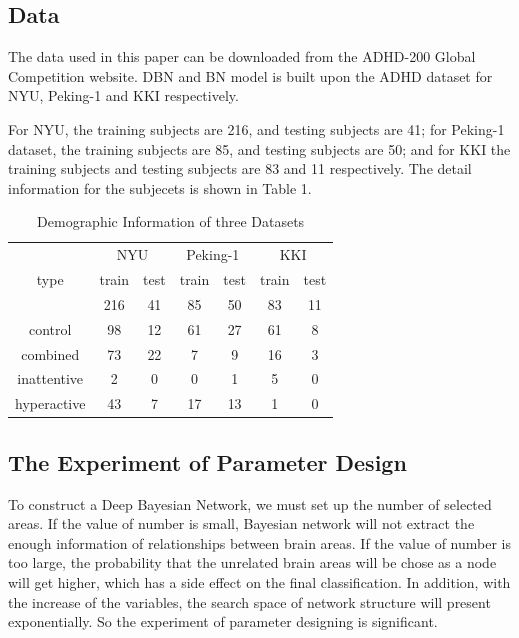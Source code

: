 \documentclass{article}
\begin{document}
\subsection{Data}
The data used in this paper can be downloaded from the ADHD-200 Global Competition website. DBN and BN model is built upon the ADHD dataset for NYU, Peking-1 and KKI respectively.


For NYU, the training subjects are 216, and testing subjects are 41; for Peking-1 dataset, the training subjects are 85, and testing subjects are 50; and for KKI the training subjects and testing subjects are 83 and 11 respectively. The detail information for the subjecets is shown in Table 1.


\begin{table}[h]
\label{tab:Information}
\caption{Demographic Information of three Datasets}
\begin{center}
\begin{tabular}{|c|c|c|c|c|c|c|}
\hline
\multirow{3}{*}{type}	& \multicolumn{2}{c|}{NYU} & \multicolumn{2}{c|}{Peking-1} & \multicolumn{2}{c|}{KKI} \\
\cline{2-7}\rule{0pt}{5pt}
					 	& train &  test  & train	& test 	& train & test  \\
						& 216	& 41	  &    85   &   50  &   83   &   11 \\ [2pt]
\hline \rule{0pt}{12pt}
control					& 98	    & 12    &    61   &    27 &   61    &   8 \\
combined					& 73		& 22   &    7    &    9  &   16    &   3 \\
inattentive				& 2		& 0    &    0    &    1  &   5     &   0 \\
hyperactive				& 43		& 7    &    17   &    13 &   1    &   0 \\[2pt]
\hline
\end{tabular}
\end{center}
\end{table}



\subsection{The Experiment of Parameter Design}
To construct a Deep Bayesian Network, we must set up the number of selected areas. If the value of number is small, Bayesian network will not extract the enough information of relationships between brain areas. If the value of number is too large, the probability that the unrelated brain areas will be chose as a node will get higher, which has a side effect on the final classification. In addition,  with the increase of the variables, the search space of network structure will present exponentially. So the experiment of parameter designing is significant.
\end{document}
